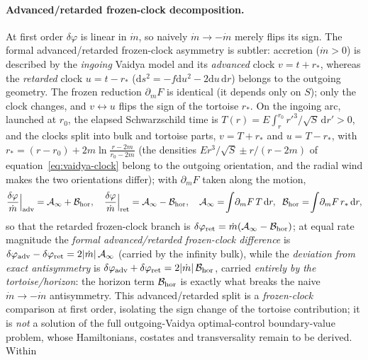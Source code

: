\documentclass[12pt]{iopart}
\newcommand{\dd}{\mathrm{d}}
\theoremstyle{plain}
\theoremstyle{definition}
\theoremstyle{plain}
\theoremstyle{remark}
\begin{document}
\paragraph{Advanced/retarded frozen-clock decomposition.} At first order $\delta\varphi$ is
linear in $\dot m$, so naively $\dot m\to-\dot m$ merely flips its sign. The
formal advanced/retarded frozen-clock asymmetry is subtler: accretion ($\dot m>0$) is
described by the \emph{ingoing} Vaidya model and its \emph{advanced} clock $v=t+r_*$,
whereas the \emph{retarded} clock $u=t-r_*$ ($\dd s^2=-f\dd u^2-2\dd u\,\dd r$) belongs to
the outgoing geometry. The frozen reduction $\partial_m F$ is identical
(it depends only on $S$); only the clock changes, and $v\leftrightarrow u$ flips the
sign of the tortoise $r_*$. On the ingoing arc, launched at $r_0$, the elapsed
Schwarzschild time is $T(r)=E\int_r^{r_0}r'^3/\sqrt S\,\dd r'>0$, and the clocks split into
bulk and tortoise parts, $v=T+r_*$ and $u=T-r_*$, with
$r_*=(r-r_0)+2m\ln\!\frac{r-2m}{r_0-2m}$ (the densities $E r^3/\sqrt S\pm r/(r-2m)$ of
equation~\eqref{eq:vaidya-clock} belong to the outgoing orientation, and the radial wind
makes the two orientations differ); with $\partial_m F$ taken along the motion,
\begin{equation}
    \frac{\delta\varphi}{\dot m}\Big|_{\rm adv}=\mathcal{A}_\infty+\mathcal{B}_{\rm hor},
    \quad
    \frac{\delta\varphi}{\dot m}\Big|_{\rm ret}=\mathcal{A}_\infty-\mathcal{B}_{\rm hor},
    \quad
    \mathcal{A}_\infty=\!\int\!\partial_m F\,T\,\dd r,\;\;
    \mathcal{B}_{\rm hor}=\!\int\!\partial_m F\,r_*\,\dd r,
    \label{eq:vaidya-asymmetry}
\end{equation}
so that the retarded frozen-clock branch is
$\delta\varphi_{\rm ret}=\dot m(\mathcal{A}_\infty-\mathcal{B}_{\rm hor})$; at equal
rate magnitude the \emph{formal advanced/retarded frozen-clock difference} is
$\delta\varphi_{\rm adv}-\delta\varphi_{\rm ret}=2|\dot m|\,\mathcal{A}_\infty$
(carried by the infinity bulk), while the \emph{deviation from exact antisymmetry} is
$\delta\varphi_{\rm adv}+\delta\varphi_{\rm ret}=2|\dot m|\,\mathcal{B}_{\rm hor}$,
carried \emph{entirely by the tortoise/horizon}: the horizon term $\mathcal{B}_{\rm hor}$
is exactly what breaks the naive $\dot m\to-\dot m$ antisymmetry. This
advanced/retarded split is a \emph{frozen-clock} comparison at first order, isolating the
sign change of the tortoise contribution; it is \emph{not} a solution of the full
outgoing-Vaidya optimal-control boundary-value problem, whose Hamiltonians, costates and
transversality remain to be derived. Within
\end{document}
